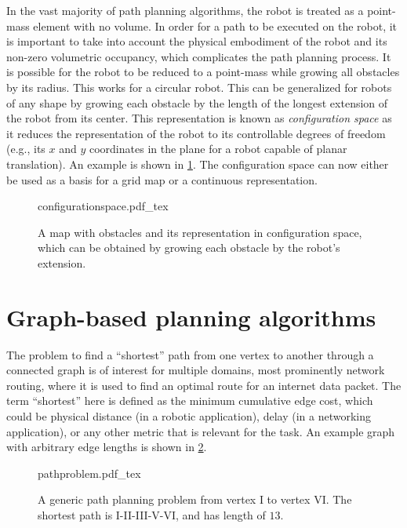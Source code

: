 In the vast majority of path planning algorithms, the robot is treated as a point-mass element with no volume. In order for a path to be executed on the robot, it is important to take into account the physical embodiment of the robot and its non-zero volumetric occupancy, which complicates the path planning process.
It is possible for the robot to be reduced to a point-mass while growing all obstacles by its radius. This works for a circular robot. This can be generalized for robots of any shape by growing each obstacle by the length of the longest extension of the robot from its center. This representation is known as \textsl{configuration space} as it reduces the representation of the robot to its controllable degrees of freedom (e.g., its $x$ and $y$ coordinates in the plane for a robot capable of planar translation). An example is shown in \cref{fig:cspace}. The configuration space can now either be used as a basis for a grid map or a continuous representation.

\begin{figure}
    \centering
    \def\svgwidth{0.9\textwidth}
    {configurationspace.pdf_tex}
    \caption{A map with obstacles and its representation in configuration space, which can be obtained by growing each obstacle by the robot's extension. \label{fig:cspace}}
\end{figure}


\section{Graph-based planning algorithms}\label{chap:pathplanning:graph-based}

The problem to find a ``shortest'' path from one vertex to another through a connected graph is of interest for multiple domains, most prominently network routing, where it is used to find an optimal route for an internet data packet.
The term ``shortest'' here is defined as the minimum cumulative edge cost, which could be physical distance (in a robotic application), delay (in a networking application), or any other metric that is relevant for the task. An example graph with arbitrary edge lengths is shown in \cref{fig:pathproblem}.

\begin{figure}
    \centering
    \def\svgwidth{0.6\textwidth}
    {pathproblem.pdf_tex}
    \caption{A generic path planning problem from vertex I to vertex VI. The shortest path is I-II-III-V-VI, and has length of $13$. \label{fig:pathproblem}}
\end{figure}

